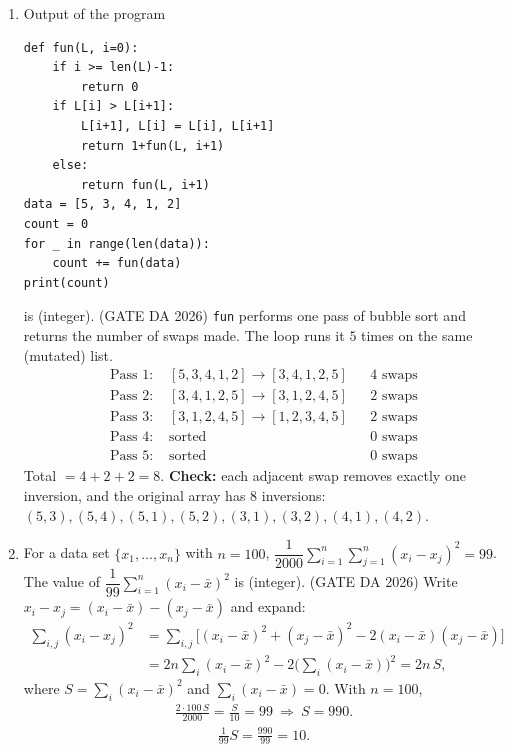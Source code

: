\begin{enumerate}[label=\textbf{Q.\arabic*},leftmargin=*,start=1]
\item[\textbf{Q.58}] Output of the program
\begin{lstlisting}
def fun(L, i=0):
    if i >= len(L)-1:
        return 0
    if L[i] > L[i+1]:
        L[i+1], L[i] = L[i], L[i+1]
        return 1+fun(L, i+1)
    else:
        return fun(L, i+1)
data = [5, 3, 4, 1, 2]
count = 0
for _ in range(len(data)):
    count += fun(data)
print(count)
\end{lstlisting}
is \underline{\hspace{1.5cm}} (integer).
\hfill (GATE DA 2026)
\solution
\texttt{fun} performs one pass of bubble sort and returns the number of swaps made. The loop runs it
$5$ times on the same (mutated) list.
\begin{align*}
\text{Pass 1: }&[5,3,4,1,2]\to[3,4,1,2,5]&&\text{4 swaps}\\
\text{Pass 2: }&[3,4,1,2,5]\to[3,1,2,4,5]&&\text{2 swaps}\\
\text{Pass 3: }&[3,1,2,4,5]\to[1,2,3,4,5]&&\text{2 swaps}\\
\text{Pass 4: }&\text{sorted}&&\text{0 swaps}\\
\text{Pass 5: }&\text{sorted}&&\text{0 swaps}
\end{align*}
Total $=4+2+2=8$. \textbf{Check:} each adjacent swap removes exactly one inversion, and the original
array has $8$ inversions: $(5,3),(5,4),(5,1),(5,2),(3,1),(3,2),(4,1),(4,2)$.

\item[\textbf{Q.62}] For a data set $\{x_1,\dots,x_n\}$ with $n=100$,
$\dfrac1{2000}\displaystyle\sum_{i=1}^n\sum_{j=1}^n(x_i-x_j)^2=99$. The value of
$\dfrac1{99}\displaystyle\sum_{i=1}^n(x_i-\bar x)^2$ is \underline{\hspace{1.5cm}} (integer).
\hfill (GATE DA 2026)
\solution
Write $x_i-x_j=(x_i-\bar x)-(x_j-\bar x)$ and expand:
\begin{align}
\sum_{i,j}(x_i-x_j)^2&=\sum_{i,j}\big[(x_i-\bar x)^2+(x_j-\bar x)^2-2(x_i-\bar x)(x_j-\bar x)\big]\\
&=2n\sum_i(x_i-\bar x)^2-2\Big(\sum_i(x_i-\bar x)\Big)^2
=2n\,S,
\end{align}
where $S=\sum_i(x_i-\bar x)^2$ and $\sum_i(x_i-\bar x)=0$. With $n=100$,
\begin{align}
\frac{2\cdot100\,S}{2000}=\frac{S}{10}=99\ \Rightarrow\ S=990 .
\end{align}
\begin{align}
\frac1{99}S=\frac{990}{99}=\boxed{10}.
\end{align}


\end{enumerate}
